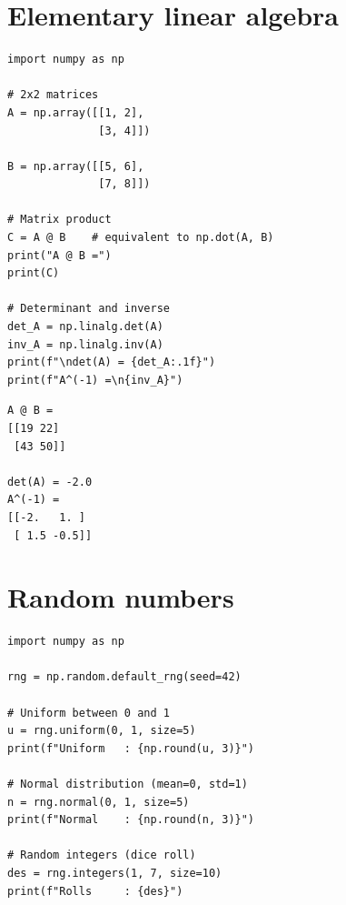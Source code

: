 \section{Elementary linear algebra}

\begin{codeblock}[title=\textbf{Python}]
\begin{verbatim}
import numpy as np

# 2x2 matrices
A = np.array([[1, 2],
              [3, 4]])

B = np.array([[5, 6],
              [7, 8]])

# Matrix product
C = A @ B    # equivalent to np.dot(A, B)
print("A @ B =")
print(C)

# Determinant and inverse
det_A = np.linalg.det(A)
inv_A = np.linalg.inv(A)
print(f"\ndet(A) = {det_A:.1f}")
print(f"A^(-1) =\n{inv_A}")
\end{verbatim}
\end{codeblock}

\begin{codeoutput}
\begin{verbatim}
A @ B =
[[19 22]
 [43 50]]

det(A) = -2.0
A^(-1) =
[[-2.   1. ]
 [ 1.5 -0.5]]
\end{verbatim}
\end{codeoutput}

\section{Random numbers}

\begin{codeblock}[title=\textbf{Python}]
\begin{verbatim}
import numpy as np

rng = np.random.default_rng(seed=42)

# Uniform between 0 and 1
u = rng.uniform(0, 1, size=5)
print(f"Uniform   : {np.round(u, 3)}")

# Normal distribution (mean=0, std=1)
n = rng.normal(0, 1, size=5)
print(f"Normal    : {np.round(n, 3)}")

# Random integers (dice roll)
des = rng.integers(1, 7, size=10)
print(f"Rolls     : {des}")
\end{verbatim}
\end{codeblock}

